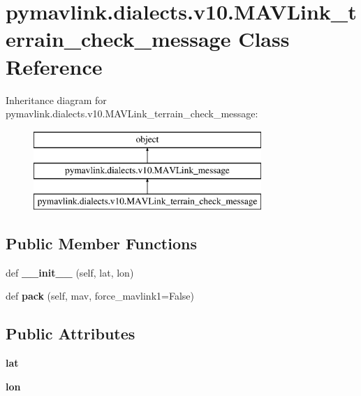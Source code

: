 \hypertarget{classpymavlink_1_1dialects_1_1v10_1_1MAVLink__terrain__check__message}{}\section{pymavlink.\+dialects.\+v10.\+M\+A\+V\+Link\+\_\+terrain\+\_\+check\+\_\+message Class Reference}
\label{classpymavlink_1_1dialects_1_1v10_1_1MAVLink__terrain__check__message}
Inheritance diagram for pymavlink.\+dialects.\+v10.\+M\+A\+V\+Link\+\_\+terrain\+\_\+check\+\_\+message\+:\begin{figure}[H]
\begin{center}
\leavevmode
\includegraphics[height=3.000000cm]{classpymavlink_1_1dialects_1_1v10_1_1MAVLink__terrain__check__message}
\end{center}
\end{figure}
\subsection*{Public Member Functions}
\begin{DoxyCompactItemize}
\item 
\mbox{\label{classpymavlink_1_1dialects_1_1v10_1_1MAVLink__terrain__check__message_a54a89b6637f75d97625f00b7bf7247bd}} 
def {\bfseries \+\_\+\+\_\+init\+\_\+\+\_\+} (self, lat, lon)
\item 
\mbox{\label{classpymavlink_1_1dialects_1_1v10_1_1MAVLink__terrain__check__message_a411e8debb8881ef0845fd83da5a79ac3}} 
def {\bfseries pack} (self, mav, force\+\_\+mavlink1=False)
\end{DoxyCompactItemize}
\subsection*{Public Attributes}
\begin{DoxyCompactItemize}
\item 
\mbox{\label{classpymavlink_1_1dialects_1_1v10_1_1MAVLink__terrain__check__message_a71bdccb21e1c3f7ae6b6897b57ab09ef}} 
{\bfseries lat}
\item 
\mbox{\label{classpymavlink_1_1dialects_1_1v10_1_1MAVLink__terrain__check__message_aa01fedf7b5d5c88ffcf9e63a0c8ec454}} 
{\bfseries lon}
\end{DoxyCompactItemize}
